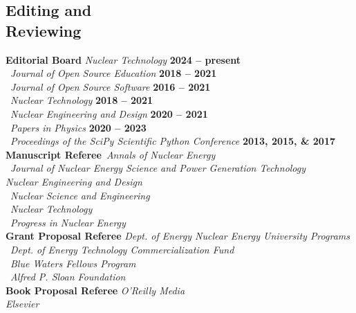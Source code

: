 \documentclass[margin,line]{resume}
\begin{document}
\begin{resume}
    \section{\mysidestyle Editing and\\Reviewing}

    \textbf{Editorial Board} \hfill \emph{Nuclear Technology} \textbf{2024 -- present}\vspace{2mm}\\%
                    \mbox{}~\hfill \emph{Journal of Open Source Education} \textbf{2018 -- 2021}\\%
                    \mbox{}~\hfill \emph{Journal of Open Source Software} \textbf{2016 -- 2021}\\%
                    \mbox{}~\hfill \emph{Nuclear Technology} \textbf{2018 -- 2021}\vspace{2mm}\\%
                    \mbox{}~\hfill \emph{Nuclear Engineering and Design} \textbf{2020 -- 2021}\vspace{2mm}\\%
                    \mbox{}~\hfill \emph{Papers in Physics} \textbf{2020 -- 2023}\vspace{2mm}\\%
                    \mbox{}~\hfill \emph{Proceedings of the SciPy Scientific Python Conference} \textbf{2013, 2015, \& 2017}\vspace{2mm}\\%
    \textbf{Manuscript Referee}~\hfill\emph{Annals of Nuclear Energy}\\%
                            \mbox{}~\hfill \emph{Journal of Nuclear Energy Science and Power Generation Technology} \\%
                            \mbox{}\hfill \emph{Nuclear Engineering and Design}\\%
                            \mbox{}~\hfill\emph{Nuclear Science and Engineering}\\%
                            \mbox{}~\hfill\emph{Nuclear Technology}\\%
                            \mbox{}~\hfill\emph{Progress in Nuclear Energy}\vspace{2mm}\\%
    \textbf{Grant Proposal Referee} \hfill \emph{Dept. of Energy Nuclear Energy University Programs}\\%
                            \mbox{}~\hfill\emph{Dept. of Energy Technology Commercialization Fund}\\%
                            \mbox{}~\hfill\emph{Blue Waters Fellows Program}\vspace{2mm}\\%
                            \mbox{}~\hfill\emph{Alfred P. Sloan Foundation}\vspace{2mm}\\%
    \textbf{Book Proposal Referee} \hfill\emph{O'Reilly Media}\\%
                            \mbox{}\hfill\emph{Elsevier}\vspace{2mm}\\%

\end{resume}
\end{document}
